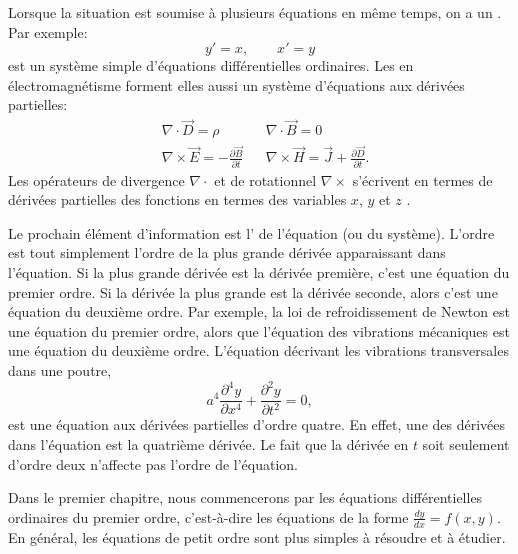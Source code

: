 Lorsque la situation est soumise à plusieurs équations en même temps, on a un
\emph{}.  
Par exemple: 
\begin{equation*}
	y' = x , \qquad x' = y
\end{equation*}
est un système simple d'équations différentielles ordinaires.
Les  en électromagnétisme forment elles aussi un système d'équations aux dérivées partielles:
\begin{align*}
	& \nabla \cdot \vec{D} = \rho & & \nabla \cdot \vec{B} = 0  \\
	& \nabla \times \vec{E} = - \frac{\partial \vec{B}}{\partial t} &
	& \nabla \times \vec{H} = \vec{J} + \frac{\partial \vec{D}}{\partial t} .
\end{align*}
Les opérateurs de divergence $\nabla \cdot$ et de rotationnel $\nabla \times$ 
s'écrivent en termes de dérivées partielles des fonctions en termes des variables $x$, $y$ et $z$ .

\medskip

Le prochain élément d'information est l'\emph{} de l'équation (ou du système).   
L'ordre est tout simplement l'ordre de la plus grande dérivée apparaissant dans l'équation.  
Si la plus grande dérivée est la dérivée première, c'est une équation du premier ordre.  
Si la dérivée la plus grande est la dérivée seconde, alors c'est une équation du deuxième ordre.  
Par exemple, la loi de refroidissement de Newton est une équation du premier ordre, 
alors que l'équation des vibrations mécaniques est une équation du deuxième ordre.  
L'équation décrivant les vibrations transversales dans une poutre, 
\begin{equation*}
	a^4 \frac{\partial^4 y}{\partial x^4} + \frac{\partial^2 y}{\partial t^2} = 0,
\end{equation*}
est une équation aux dérivées partielles d'ordre quatre.  
En effet, une des dérivées dans l'équation est la quatrième dérivée.  
Le fait que la dérivée en $t$ soit seulement d'ordre deux n'affecte pas l'ordre de l'équation.

Dans le premier chapitre, nous commencerons par les équations différentielles ordinaires du premier ordre, 
c'est-à-dire les équations de la forme $\frac{dy}{dx} = f(x,y)$.  
En général, les équations de petit ordre sont plus simples à résoudre et à étudier.

\medskip

